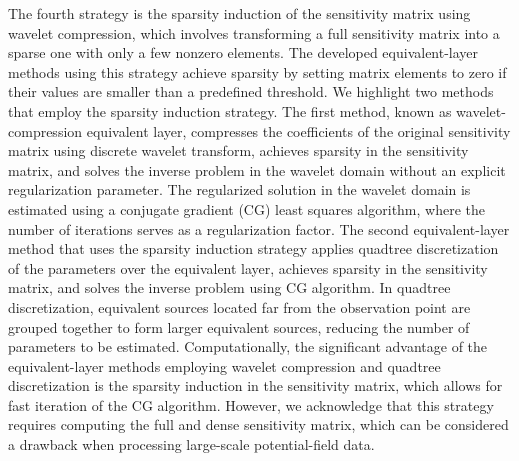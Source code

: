 \documentclass[utf8]{FrontiersinHarvard} %
\begin{document}
	
	The fourth strategy is the sparsity induction of the sensitivity matrix using wavelet compression, which involves transforming a full sensitivity matrix into a sparse one with only a few nonzero elements.
	The developed equivalent-layer methods using this strategy achieve sparsity by setting matrix elements to zero if their values are smaller than a predefined threshold.
	We highlight two methods that employ the sparsity induction strategy.
	The first method, known as wavelet-compression equivalent layer, compresses the coefficients of the original sensitivity matrix using discrete wavelet transform, achieves sparsity in the sensitivity matrix, and solves the inverse problem in the wavelet domain without an explicit regularization parameter.
	The regularized solution in the wavelet domain is estimated using a conjugate gradient (CG) least squares algorithm, where the number of iterations serves as a regularization factor.
	The second equivalent-layer method that uses the sparsity induction strategy applies quadtree discretization of the parameters over the equivalent layer, achieves sparsity in the sensitivity matrix, and solves the inverse problem using CG algorithm.
	In quadtree discretization, equivalent sources located far from the observation point are grouped together to form larger equivalent sources, reducing the number of parameters to be estimated.
	Computationally, the significant advantage of the equivalent-layer methods employing wavelet compression and quadtree discretization is the sparsity induction in the sensitivity matrix, which allows for fast iteration of the CG algorithm.
	However, we acknowledge that this strategy requires computing the full and dense sensitivity matrix, which can be considered a drawback when processing large-scale potential-field data.
	
\end{document}
